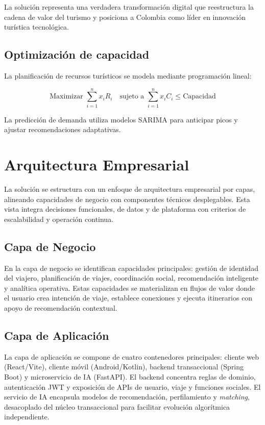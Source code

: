 \documentclass[12pt, letterpaper]{article}
\begin{document}
La solución representa una verdadera transformación digital que reestructura la cadena de valor del turismo y posiciona a Colombia como líder en innovación turística tecnológica.

\subsection*{Optimización de capacidad}

La planificación de recursos turísticos se modela mediante programación lineal:

\begin{equation}
\text{Maximizar } \sum_{i=1}^{n} x_i R_i \quad \text{sujeto a } \sum_{i=1}^{n} x_i C_i \leq \text{Capacidad}
\end{equation}

La predicción de demanda utiliza modelos SARIMA para anticipar picos y ajustar recomendaciones adaptativas.

\section{Arquitectura Empresarial}

La solución se estructura con un enfoque de arquitectura empresarial por capas, alineando capacidades de negocio con componentes técnicos desplegables. Esta vista integra decisiones funcionales, de datos y de plataforma con criterios de escalabilidad y operación continua.

\subsection{Capa de Negocio}

En la capa de negocio se identifican capacidades principales: gestión de identidad del viajero, planificación de viajes, coordinación social, recomendación inteligente y analítica operativa. Estas capacidades se materializan en flujos de valor donde el usuario crea intención de viaje, establece conexiones y ejecuta itinerarios con apoyo de recomendación contextual.

\subsection{Capa de Aplicación}

La capa de aplicación se compone de cuatro contenedores principales: cliente web (React/Vite), cliente móvil (Android/Kotlin), backend transaccional (Spring Boot) y microservicio de IA (FastAPI). El backend concentra reglas de dominio, autenticación JWT y exposición de APIs de usuario, viaje y funciones sociales. El servicio de IA encapsula modelos de recomendación, perfilamiento y \textit{matching}, desacoplado del núcleo transaccional para facilitar evolución algorítmica independiente.
\end{document}
